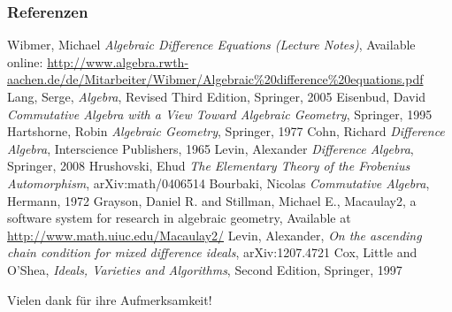 \documentclass{beamer}
\theoremstyle{definition}
\begin{document}
\begin{frame}[allowframebreaks]\frametitle{Referenzen}
\begin{thebibliography}{9}
 Wibmer, Michael \emph{Algebraic Difference Equations (Lecture Notes)}, Available online: \url{http://www.algebra.rwth-aachen.de/de/Mitarbeiter/Wibmer/Algebraic\%20difference\%20equations.pdf}
 Lang, Serge, \emph{Algebra}, Revised Third Edition, Springer, 2005
 Eisenbud, David \emph{Commutative Algebra with a View Toward Algebraic Geometry}, Springer, 1995
 Hartshorne, Robin \emph{Algebraic Geometry}, Springer, 1977
 Cohn,  Richard \emph{Difference Algebra}, Interscience Publishers, 1965
 Levin, Alexander \emph{Difference Algebra}, Springer, 2008
 Hrushovski, Ehud \emph{The Elementary Theory of the Frobenius Automorphism}, arXiv:math/0406514 
 Bourbaki, Nicolas \emph{Commutative Algebra}, Hermann, 1972
 Grayson, Daniel R. and Stillman, Michael E., Macaulay2, a software system for research in algebraic geometry, Available at \href{http://www.math.uiuc.edu/Macaulay2/}{http://www.math.uiuc.edu/Macaulay2/}
 Levin, Alexander, \emph{On the ascending chain condition for mixed difference ideals}, 	arXiv:1207.4721
 Cox, Little and O'Shea, \emph{ Ideals, Varieties and Algorithms}, Second Edition, Springer, 1997
\end{thebibliography}
\end{frame}
\begin{frame}
\LARGE Vielen dank für ihre Aufmerksamkeit!
\end{frame}
\end{document}

